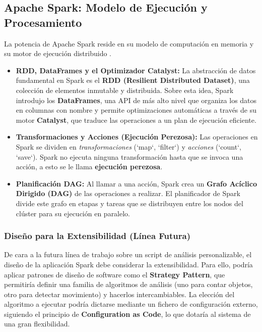 \subsection{Apache Spark: Modelo de Ejecución y Procesamiento}
La potencia de Apache Spark reside en su modelo de computación en memoria y su motor de ejecución distribuido \cite{SparkWebDoc}.
\begin{itemize}
    \item \textbf{RDD, DataFrames y el Optimizador Catalyst:} La abstracción de datos fundamental en Spark es el \textbf{RDD (Resilient Distributed Dataset)}, una colección de elementos inmutable y distribuida. Sobre esta idea, Spark introdujo los \textbf{DataFrames}, una API de más alto nivel que organiza los datos en columnas con nombre y permite optimizaciones automáticas a través de su motor \textbf{Catalyst}, que traduce las operaciones a un plan de ejecución eficiente.
    \item \textbf{Transformaciones y Acciones (Ejecución Perezosa):} Las operaciones en Spark se dividen en \textit{transformaciones} (`map`, `filter`) y \textit{acciones} (`count`, `save`). Spark no ejecuta ninguna transformación hasta que se invoca una acción, a esto se le llama \textbf{ejecución perezosa}.
    \item \textbf{Planificación DAG:} Al llamar a una acción, Spark crea un \textbf{Grafo Acíclico Dirigido (DAG)} de las operaciones a realizar. El planificador de Spark divide este grafo en etapas y tareas que se distribuyen entre los nodos del clúster para su ejecución en paralelo.
\end{itemize}

\subsubsection{Diseño para la Extensibilidad (Línea Futura)}
De cara a la futura línea de trabajo sobre un script de análisis personalizable, el diseño de la aplicación Spark debe considerar la extensibilidad. Para ello, podría aplicar patrones de diseño de software como el \textbf{Strategy Pattern}, que permitiría definir una familia de algoritmos de análisis (uno para contar objetos, otro para detectar movimiento) y hacerlos intercambiables. La elección del algoritmo a ejecutar podría dictarse mediante un fichero de configuración externo, siguiendo el principio de \textbf{Configuration as Code}, lo que dotaría al sistema de una gran flexibilidad.

